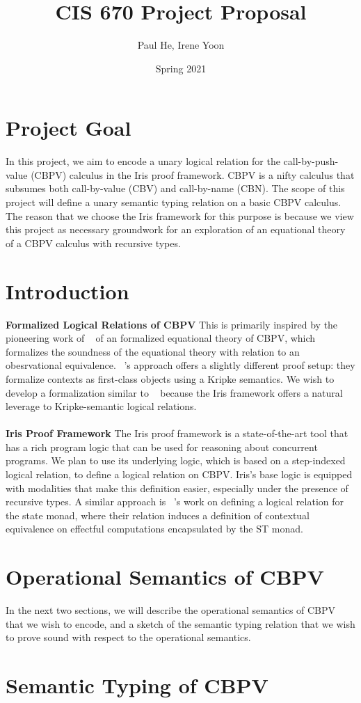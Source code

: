 \documentclass[11pt,twoside]{article}
\begin{document}
\title{CIS 670 Project Proposal}
\author{Paul He, Irene Yoon}
\date{Spring 2021}

\maketitle{}


\section{Project Goal}
In this project, we aim to encode a unary logical relation for the call-by-push-
value (CBPV) calculus in the Iris proof framework. CBPV is a nifty calculus that
subsumes both call-by-value (CBV) and call-by-name (CBN). The scope of this project
will define a unary semantic typing relation on a basic CBPV calculus. The reason
that we choose the Iris framework for this purpose is because we view this project
as necessary groundwork for an exploration of an equational theory of a CBPV
calculus with recursive types. 

\section{Introduction} 

\textbf{Formalized Logical Relations of CBPV}
This is primarily inspired by the pioneering work of 
~\cite{rizkallah} of an formalized equational theory of CBPV, which formalizes the
soundness of the equational theory with relation to an obesrvational equivalence.
~\cite{forster}'s approach offers a slightly different proof setup: they formalize 
contexts as first-class objects using a Kripke semantics.
We wish to develop a formalization similar to ~\cite{forster} because the Iris
framework offers a natural leverage to Kripke-semantic logical relations.\\
\\
\textbf{Iris Proof Framework}
The Iris proof framework is a state-of-the-art tool that has a rich program logic 
that can be used for reasoning about concurrent programs. 
We plan to use its underlying logic, which is based on a 
step-indexed logical relation, to define a logical relation on CBPV.
Iris's base logic is equipped with modalities that make this definition easier,
especially under the presence of recursive types.
A similar approach is ~\cite{timany}'s work on defining a logical relation for 
the state monad, where their relation induces a definition of contextual 
equivalence on effectful computations encapsulated by the ST monad.

\section{Operational Semantics of CBPV}
In the next two sections, we will describe the operational semantics of CBPV that we wish
to encode, and a sketch of the semantic typing relation that we wish to prove sound 
with respect to the operational semantics.

\section{Semantic Typing of CBPV}



\end{document}
